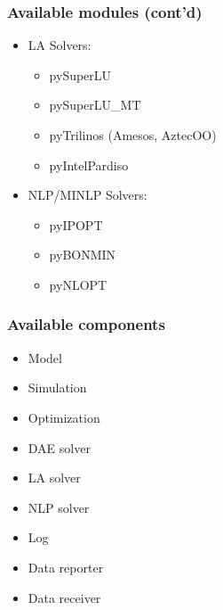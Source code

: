 \documentclass{beamer}
\begin{document}
\begin{frame}
\frametitle{Available modules (cont'd)}
\begin{block}{}
\begin{itemize}
  \item LA Solvers: 
  \begin{itemize}
    \item pySuperLU
    \item pySuperLU\_MT
    \item pyTrilinos (Amesos, AztecOO)
    \item pyIntelPardiso
  \end{itemize}
\end{itemize}
\end{block}
\begin{block}{}
\begin{itemize}
  \item NLP/MINLP Solvers: 
  \begin{itemize}
    \item pyIPOPT
    \item pyBONMIN
    \item pyNLOPT
  \end{itemize}
\end{itemize}
\end{block}
\end{frame}

\begin{frame}
\frametitle{Available components}
\begin{block}{}
\begin{itemize}
  \item Model
  \item Simulation
  \item Optimization
  \item DAE solver
  \item LA solver
  \item NLP solver
  \item Log
  \item Data reporter
  \item Data receiver
\end{itemize}
\end{block}
\end{frame}
\end{document}
